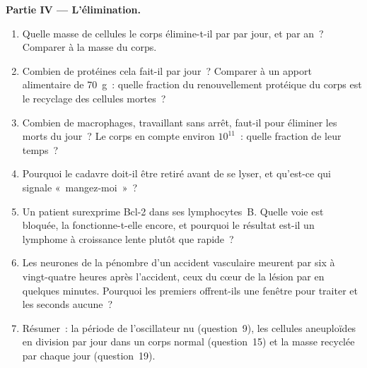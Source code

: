 \begin{problem}
\medskip
\noindent\textbf{Partie IV --- L'élimination.}
\begin{enumerate}[resume]
  \item Quelle masse de cellules le corps élimine-t-il par  par
        jour, et par an~? Comparer à la masse du corps.
  \item Combien de protéines cela fait-il par jour~? Comparer à un
        apport alimentaire de \qty{70}{g}~: quelle fraction du
        renouvellement protéique du corps est le recyclage des cellules
        mortes~?
  \item Combien de macrophages, travaillant sans arrêt, faut-il pour
        éliminer les morts du jour~? Le corps en compte environ
        $10^{11}$~: quelle fraction de leur temps~?
  \item Pourquoi le cadavre doit-il être retiré avant de se lyser, et
        qu'est-ce qui signale «~mangez-moi~»~?
  \item Un patient surexprime Bcl-2 dans ses lymphocytes~B. Quelle voie
        est bloquée, la  fonctionne-t-elle encore, et
        pourquoi le résultat est-il un lymphome à croissance lente
        plutôt que rapide~?
  \item Les neurones de la pénombre d'un accident vasculaire meurent
        par  six à vingt-quatre heures après l'accident, ceux
        du cœur de la lésion par  en quelques minutes. Pourquoi
        les premiers offrent-ils une fenêtre pour traiter et les
        seconds aucune~?
  \item Résumer~: la période de l'oscillateur nu (question~9), les
        cellules aneuploïdes en division par jour dans un corps normal
        (question~15) et la masse recyclée par  chaque jour
        (question~19).
\end{enumerate}
\end{problem}
